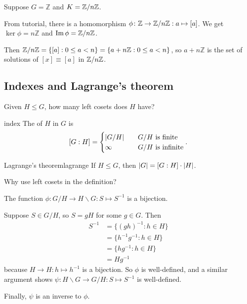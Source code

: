 \documentclass[12pt,letterpaper]{report}
\begin{document}
\begin{ex}
  Suppose $G = \mathbb{Z}$ and $K = \mathbb{Z}/{n}\mathbb{Z}$.

  From tutorial, there is a homomorphism $\phi \colon \mathbb{Z} \to \mathbb{Z}/{n}\mathbb{Z} : a \mapsto [a]$.
  We get $\ker\phi = n\mathbb{Z}$ and $\operatorname{Im}\phi = \mathbb{Z}/{n}\mathbb{Z}$.

  Then $\mathbb{Z}/{n}\mathbb{Z} = \{[a] : 0 \leq a < n\} = \{a + n\mathbb{Z} : 0 \leq a < n\}$, so
  $a + n\mathbb{Z}$ is the set of solutions of $[x] \equiv [a]$ in $\mathbb{Z}/{n}\mathbb{Z}$.
\end{ex}

\pagebreak
\subsection{Indexes and Lagrange's theorem}

Given $H \leq G$, how many left cosets does $H$ have?

\begin{defn}{index}{}
  The  of $H$ in $G$ is
  \[
    [G : H] = \begin{cases}
      \lvert G/H\rvert \quad & G/H \text{ is finite} \\
      \infty & G/H \text{ is infinite}
    \end{cases}.
  \]
\end{defn}

\begin{thm}{Lagrange's theorem}{lagrange}
  If $H \leq G$, then $\lvert G\rvert = [G : H] \cdot \lvert H\rvert$.
\end{thm}

Why use left cosets in the definition?

\begin{prop}{}{}
  The function $\phi \colon G/H \to H \backslash G : S \mapsto S^{-1}$ is a bijection.
\end{prop}

\begin{thmproof}
  Suppose $S \in G/H$, so $S = gH$ for some $g \in G$.
  Then
  \begin{align*}
    S^{-1} &= \{(gh)^{-1} : h \in H\} \\
    &= \{h^{-1}g^{-1} : h \in H\} \\
    &= \{hg^{-1} : h \in H\} \\
    &= Hg^{-1}
  \end{align*}
  because $H \to H : h \mapsto h^{-1}$ is a bijection.
  So $\phi$ is well-defined, and a similar argument shows
  $\psi \colon H \backslash G \to G/H : S \mapsto S^{-1}$ is well-defined.

  Finally, $\psi$ is an inverse to $\phi$.
\end{thmproof}
\end{document}
